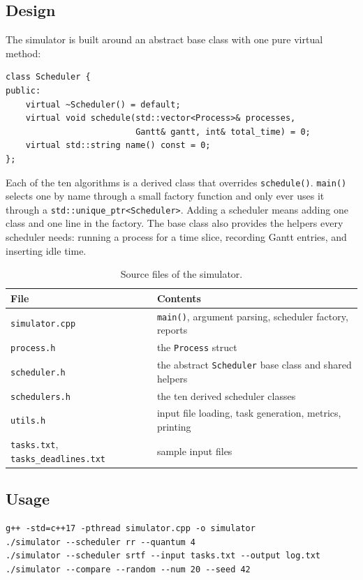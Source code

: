 \documentclass[11pt]{article}
\begin{document}
\subsection{Design}
The simulator is built around an abstract base class with one pure virtual method:

\begin{verbatim}
class Scheduler {
public:
    virtual ~Scheduler() = default;
    virtual void schedule(std::vector<Process>& processes,
                          Gantt& gantt, int& total_time) = 0;
    virtual std::string name() const = 0;
};
\end{verbatim}

Each of the ten algorithms is a derived class that overrides \texttt{schedule()}.
\texttt{main()} selects one by name through a small factory function and only ever uses it
through a \texttt{std::unique\_ptr<Scheduler>}. Adding a scheduler means adding one class
and one line in the factory. The base class also provides the helpers every scheduler
needs: running a process for a time slice, recording Gantt entries, and inserting idle time.

\begin{table}[H]
  \centering
  \begin{tabular}{ll}
    \toprule
    File & Contents \\
    \midrule
    \texttt{simulator.cpp} & \texttt{main()}, argument parsing, scheduler factory, reports \\
    \texttt{process.h} & the \texttt{Process} struct \\
    \texttt{scheduler.h} & the abstract \texttt{Scheduler} base class and shared helpers \\
    \texttt{schedulers.h} & the ten derived scheduler classes \\
    \texttt{utils.h} & input file loading, task generation, metrics, printing \\
    \texttt{tasks.txt}, \texttt{tasks\_deadlines.txt} & sample input files \\
    \bottomrule
  \end{tabular}
  \caption{Source files of the simulator.}
\end{table}

\subsection{Usage}
\begin{verbatim}
g++ -std=c++17 -pthread simulator.cpp -o simulator
./simulator --scheduler rr --quantum 4
./simulator --scheduler srtf --input tasks.txt --output log.txt
./simulator --compare --random --num 20 --seed 42
\end{verbatim}
\end{document}
